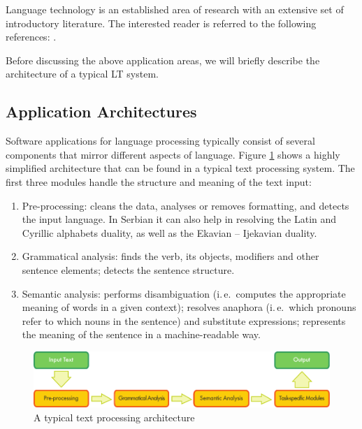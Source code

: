 \begin{multicols}{2}
Language technology is an established area of research with an extensive set of introductory literature. The interested reader is referred to the following references:  \cite{jurafsky-martin01, manning-schuetze1, lt-survey1}.

Before discussing the above application areas, we will briefly describe the architecture of a typical LT system.

 \subsection {Application Architectures}
   
Software applications for language processing typically consist of several components that mirror different aspects of language. Figure \ref{fig:textprocessingarch_en} shows a highly simplified architecture that can be found in a typical text processing system. The first three modules handle the structure and meaning of the text input:

\begin{enumerate}
 \item Pre-processing: cleans the data, analyses or removes formatting, and detects the input language. In Serbian it can also help in resolving the Latin and Cyrillic alphabets duality, as well as the Ekavian – Ijekavian duality.
\item Grammatical analysis: finds the verb, its objects, modifiers and other sentence elements; detects the sentence structure.
\item Semantic analysis: performs disambiguation (i.\,e.~computes the appropriate meaning of words in a given context); resolves anaphora (i.\,e.~which pronouns refer to which nouns in the sentence) and substitute expressions; represents the meaning of the sentence in a machine-readable way.
\end{enumerate}

\begin{figure}[tb]
  \center
  \includegraphics[width=\textwidth]{../_media/english/text_processing_app_architecture}
  \caption{A typical text processing architecture}
  \label{fig:textprocessingarch_en}
\end{figure}


\end{multicols}
